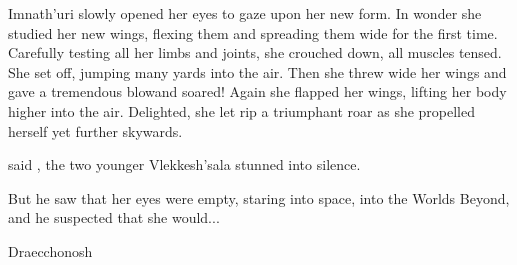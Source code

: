 Imnath'uri slowly opened her eyes to gaze upon her new form. In wonder she studied her new wings, flexing them and spreading them wide for the first time. Carefully testing all her limbs and joints, she crouched down, all muscles tensed. She set off, jumping many yards into the air. Then she threw wide her wings and gave a tremendous blow\dash and soared! Again she flapped her wings, lifting her body higher into the air. Delighted, she let rip a triumphant roar as she propelled herself yet further skywards. 

 said \HesodN, the two younger Vlekkesh'sala stunned into silence. 



But he saw that her eyes were empty, staring into space, into the Worlds Beyond, and he suspected that she would...

Draecchonosh
